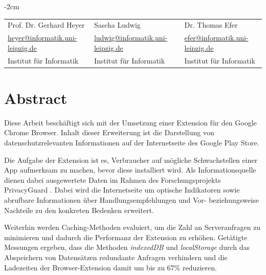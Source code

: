\documentclass[11pt, a4paper, twoside, openright, final]{book}
\makeatletter
\numberwithin{equation}{chapter}		%
\renewcommand*{\cleardoublepage}{\clearpage\if@twoside \ifodd\c@page\else
\hbox{}%
\thispagestyle{empty}%
\newpage%
\if@twocolumn\hbox{}\newpage\fi\fi\fi}
\newcommand{\1}{\mathbbm{1}}
\makeatother
\begin{document}
\begin{titlepage}
\begin{adjustwidth*}{}{-2cm}
\begin{tabular}{*{3}{C{4.5cm}}}
			\small Prof. Dr. Gerhard Heyer  & 
			\small Sascha Ludwig & 
			\small Dr. Thomas Efer \\
			
			\small \href{mailto:heyer@informatik.uni-leipzig.de }{heyer@informatik.uni-leipzig.de } & 
			\small \href{mailto:ludwig@informatik.uni-leipzig.de}{ludwig@informatik.uni-leipzig.de} &
			\small \href{mailto:efer@informatik.uni-leipzig.de }{efer@informatik.uni-leipzig.de } \\
			
			\small Institut für Informatik & 
			\small Institut für Informatik & 
			\small Institut für Informatik\\
		\end{tabular}
		
		\vspace{1.0cm}
		\centering{\today}
	\end{adjustwidth*}
\end{titlepage}
\cleardoublepage





\setcounter{page}{1}	%

\chapter*{Abstract}
\label{c:abstract}

Diese Arbeit beschäftigt sich mit der Umsetzung einer Extension für den Google Chrome Browser. Inhalt dieser Erweiterung ist die Darstellung von datenschutzrelevanten Informationen auf der Internetseite des Google Play Store.

Die Aufgabe der Extension ist es, Verbraucher auf mögliche Schwachstellen einer App aufmerksam zu machen, bevor diese installiert wird. Als Informationsquelle dienen dabei ausgewertete Daten im Rahmen des Forschungsprojekts \glqq PrivacyGuard \grqq{}.
Dabei wird die Internetseite um optische Indikatoren sowie abrufbare Informationen über Handlungsempfehlungen und  Vor- beziehungsweise Nachteile zu den konkreten Bedenken erweitert.

Weiterhin werden Caching-Methoden evaluiert, um die Zahl an Serveranfragen zu minimieren und dadurch die Performanz der Extension zu erhöhen. Getätigte Messungen ergeben, dass die Methoden \textit{indexedDB} und \textit{localStorage} durch das Abspeichern von Datensätzen redundante Anfragen verhindern und die Ladezeiten der Browser-Extension damit um bis zu 67\% reduzieren.
\end{document}

